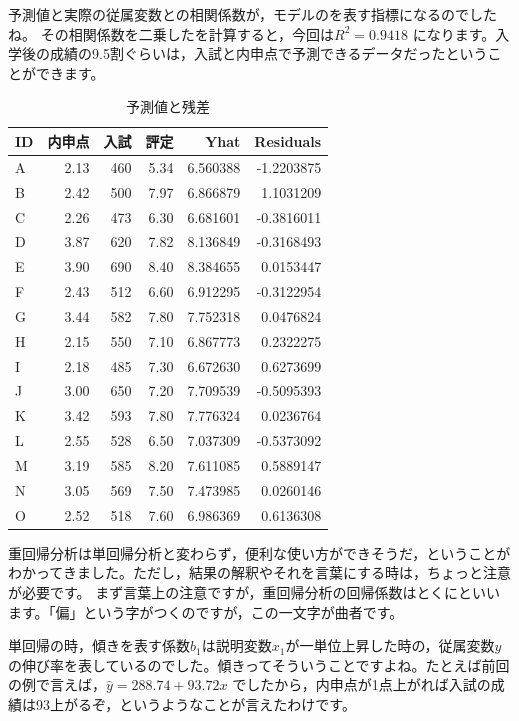 \documentclass{ltjbook}
\begin{document}
予測値と実際の従属変数との相関係数が，モデルのを表す指標になるのでしたね。
その相関係数を二乗したを計算すると，今回は$R^2=0.9418$ になります。入学後の成績の9.5割ぐらいは，入試と内申点で予測できるデータだったということができます。
\begin{table}[ht]
	\caption{予測値と残差}
	\centering
	\begin{tabular}[t]{l|rrr|rr}
		\hline
		ID & 内申点  & 入試  & 評定   & Yhat     & Residuals  \\
		\hline
		A  & 2.13 & 460 & 5.34 & 6.560388 & -1.2203875 \\
		B  & 2.42 & 500 & 7.97 & 6.866879 & 1.1031209  \\
		C  & 2.26 & 473 & 6.30 & 6.681601 & -0.3816011 \\
		D  & 3.87 & 620 & 7.82 & 8.136849 & -0.3168493 \\
		E  & 3.90 & 690 & 8.40 & 8.384655 & 0.0153447  \\
		F  & 2.43 & 512 & 6.60 & 6.912295 & -0.3122954 \\
		G  & 3.44 & 582 & 7.80 & 7.752318 & 0.0476824  \\
		H  & 2.15 & 550 & 7.10 & 6.867773 & 0.2322275  \\
		I  & 2.18 & 485 & 7.30 & 6.672630 & 0.6273699  \\
		J  & 3.00 & 650 & 7.20 & 7.709539 & -0.5095393 \\
		K  & 3.42 & 593 & 7.80 & 7.776324 & 0.0236764  \\
		L  & 2.55 & 528 & 6.50 & 7.037309 & -0.5373092 \\
		M  & 3.19 & 585 & 8.20 & 7.611085 & 0.5889147  \\
		N  & 3.05 & 569 & 7.50 & 7.473985 & 0.0260146  \\
		O  & 2.52 & 518 & 7.60 & 6.986369 & 0.6136308  \\
		\hline
	\end{tabular}
	\label{tbl::10_02}
\end{table}

重回帰分析は単回帰分析と変わらず，便利な使い方ができそうだ，ということがわかってきました。ただし，結果の解釈やそれを言葉にする時は，ちょっと注意が必要です。
まず言葉上の注意ですが，重回帰分析の回帰係数はとくにといいます。「偏」という字がつくのですが，この一文字が曲者です。

単回帰の時，傾きを表す係数$b_1$は説明変数$x_1$が一単位上昇した時の，従属変数$y$の伸び率を表しているのでした。傾きってそういうことですよね。たとえば前回の例で言えば，$\hat{y}=288.74+93.72x$ でしたから，内申点が1点上がれば入試の成績は93上がるぞ，というようなことが言えたわけです。
\end{document}
